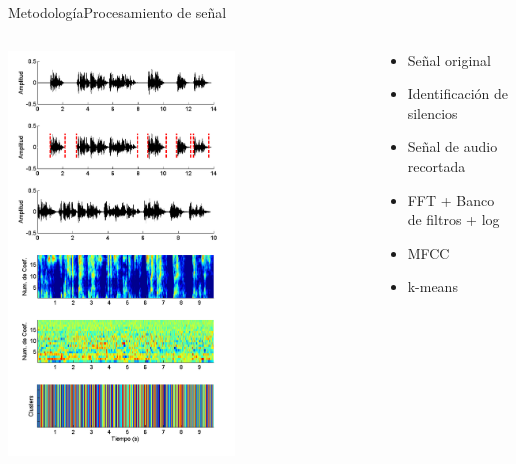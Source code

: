 \documentclass[10pt]{beamer}
\begin{document}
\begin{frame}{Metodología}{Procesamiento de señal}
\small {
\vspace{0mm} 
\begin{columns}   
  \begin{column}{0.6\textwidth} 
    \hfill  
    \includegraphics[width=0.64\textwidth]{gfx/filename5}    
  \end{column}
  \begin{column}{0.4\textwidth}
    \vspace{-8mm} 
    \begin{itemize}
      \setlength{\itemindent}{-2em}      
      \itemsep 2.7em    
      \item Señal original
      \item Identificación de silencios
      \item Señal de audio recortada
      \item FFT + Banco de filtros + log
      \item MFCC
      \item k-means
    \end{itemize}
  \end{column}   
\end{columns}   
}
\end{frame}
\end{document}
